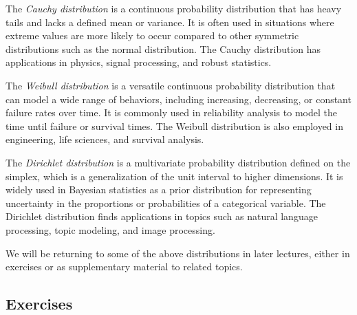 \documentclass{article}
\begin{document}
The \emph{Cauchy distribution} is a continuous probability distribution that has heavy tails and lacks a defined mean or variance. It is often used in situations where extreme values are more likely to occur compared to other symmetric distributions such as the normal distribution. The Cauchy distribution has applications in physics, signal processing, and robust statistics.

The \emph{Weibull distribution} is a versatile continuous probability distribution that can model a wide range of behaviors, including increasing, decreasing, or constant failure rates over time. It is commonly used in reliability analysis to model the time until failure or survival times. The Weibull distribution is also employed in engineering, life sciences, and survival analysis.

The \emph{Dirichlet distribution} is a multivariate probability distribution defined on the simplex, which is a generalization of the unit interval to higher dimensions. It is widely used in Bayesian statistics as a prior distribution for representing uncertainty in the proportions or probabilities of a categorical variable. The Dirichlet distribution finds applications in topics such as natural language processing, topic modeling, and image processing.

We will be returning to some of the above distributions in later lectures, either in exercises or as supplementary material to related topics.

\subsection{Exercises}
\end{document}

